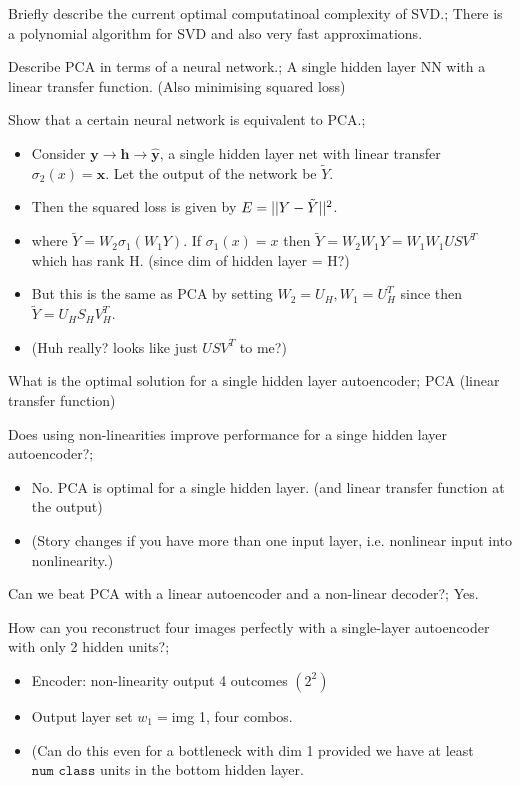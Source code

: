\documentclass{article}
\begin{document}
Briefly describe the current optimal computatinoal complexity of SVD.; There is a polynomial algorithm for SVD and also very fast approximations.

Describe PCA in terms of a neural network.; A single hidden layer NN with a linear transfer function. (Also minimising squared loss)

Show that a certain neural network is equivalent to PCA.; \begin{itemize} \item Consider $\bm{y}\rightarrow \bm{h}\rightarrow \hat{\bm{y}}$, a single hidden layer net with linear transfer $\sigma_2(x) = \bm{x}$. Let the output of the network be $\tilde{Y}$.  \item Then the squared loss is given by $E = ||Y - \Tilde{Y}||^2$. \item where $\tilde{Y}=W_2\sigma_1(W_1Y)$. If $\sigma_1(x) = x$ then $\tilde{Y}=W_2W_1Y = W_1W_1USV^T$ which has rank H. (since dim of hidden layer = H?) \item But this is the same as PCA by setting $W_2 = U_H, W_1 = U^T_H$ since then $\tilde{Y}=U_HS_HV_H^T$. \item (Huh really? looks like just $USV^T$ to me?) \end{itemize}

What is the optimal solution for a single hidden layer autoencoder; PCA (linear transfer function)

Does using non-linearities improve performance for a singe hidden layer autoencoder?; \begin{itemize} \item No. PCA is optimal for a single hidden layer. (and linear transfer function at the output) \item (Story changes if you have more than one input layer, i.e. nonlinear input into nonlinearity.) \end{itemize}

Can we beat PCA with a linear autoencoder and a non-linear decoder?; Yes.

How can you reconstruct four images perfectly with a single-layer autoencoder with only 2 hidden units?; \begin{itemize} \item Encoder: non-linearity output 4 outcomes $(2^2)$ \item Output layer set $w_1=$img 1, four combos. \item (Can do this even for a bottleneck with dim 1 provided we have at least $\texttt{num class}$ units in the bottom hidden layer. \end{itemize}
\end{document}
